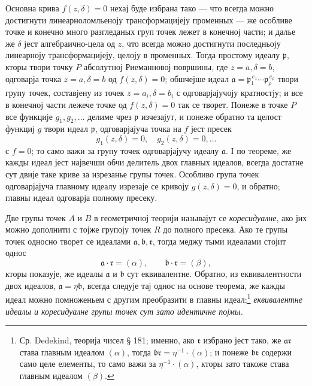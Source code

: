 ﻿\documentclass[11pt]{article}
\providecommand{\fra}{\mathfrak a}
\providecommand{\frb}{\mathfrak b}
\providecommand{\frp}{\mathfrak p}
\providecommand{\frr}{\mathfrak r}
\begin{document}
Основна крива \(f(z,\delta)=0\) нехај буде избрана тако --- что всегда можно достигнути линеарноломльеноју трансформацијеју променных --- же особливе точке и конечно много разгледаных груп точек лежет в конечној части; и далье же \(\delta\) јест алгебраично-цела од \(z\), что всегда можно достигнути последньоју линеарноју трансформацијеју, целоју в променных. Тогда простому идеалу \(\frp\), кторы твори точку \(P\) абсолутној Риеманновој површины, где \(z=a,\delta=b\), одговарја точка \(z=a,\delta=b\) од \(f(z,\delta)=0\); обшчејше идеал \(\fra=\frp_1^{\,e_1}\cdots\frp_\rho^{\,e_\rho}\) твори групу точек, составјену из точек \(z=a_i,\delta=b_i\) с одговарјајучоју кратностју; и все в конечној части лежече точке од \(f(z,\delta)=0\) так се творет. Понеже в точке \(P\) все функције \(g_1,g_2,\ldots\) делиме чрез \(\frp\) изчезајут, и понеже обратно та целост функциј \(g\) твори идеал \(\frp\), одговарјајуча точка на \(f\) јест пресек
\[
g_1(z,\delta)=0,\quad g_2(z,\delta)=0,\ldots
\]
с \(f=0\); то само важи за групу точек одговарјајучу идеалу \(\fra\). I по теореме, же кажды идеал јест највечши обчи делитель двох главных идеалов, всегда достатне сут двије таке криве за изрезанье групы точек. Особливо група точек одговарјајуча главному идеалу изрезаје се кривоју \(g(z,\delta)=0\), и обратно; главны идеал одговарја полному пресеку.

Две групы точек \(A\) и \(B\) в геометричној теорији называјут се {\itshape коресидуалне}, ако јих можно дополнити с тојже групоју точек \(R\) до полного пресека. Ако те групы точек односно творет се идеалами \(\fra,\frb,\frr\), тогда меджу тыми идеалами стојит однос
\[
\fra\cdot\frr=(\alpha),\qquad \frb\cdot\frr=(\beta),
\]
кторы показује, же идеалы \(\fra\) и \(\frb\) сут еквивалентне. Обратно, из еквивалентности двох идеалов, \(\fra=\eta\frb\), всегда следује тај однос на основе теорема, же кажды идеал можно помноженьем с другим преобразити в главны идеал;\footnote{Ср. Dedekind, теорија чисел § 181; именно, ако \(\frr\) избрано јест тако, же \(\fra\frr\) става главным идеалом \((\alpha)\), тогда \(\frb\frr=\eta^{-1}\cdot(\alpha)\); и понеже \(\frb\frr\) содержи само целе елементы, то само важи за \(\eta^{-1}\cdot(\alpha)\), кторы зато такоже става главным идеалом \((\beta)\).} {\itshape еквивалентне идеалы и коресидуалне групы точек сут зато идентичне појмы.}
\end{document}
